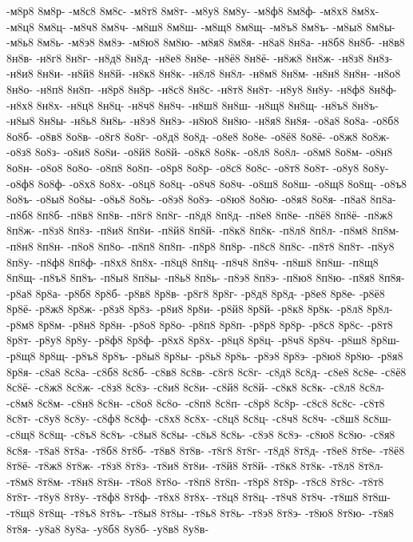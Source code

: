 {-м8р8
8м8р-
-м8с8
8м8с-
-м8т8
8м8т-
-м8у8
8м8у-
-м8ф8
8м8ф-
-м8х8
8м8х-
-м8ц8
8м8ц-
-м8ч8
8м8ч-
-м8ш8
8м8ш-
-м8щ8
8м8щ-
-м8ъ8
8м8ъ-
-м8ы8
8м8ы-
-м8ь8
8м8ь-
-м8э8
8м8э-
-м8ю8
8м8ю-
-м8я8
8м8я-
-н8а8
8н8а-
-н8б8
8н8б-
-н8в8
8н8в-
-н8г8
8н8г-
-н8д8
8н8д-
-н8е8
8н8е-
-н8ё8
8н8ё-
-н8ж8
8н8ж-
-н8з8
8н8з-
-н8и8
8н8и-
-н8й8
8н8й-
-н8к8
8н8к-
-н8л8
8н8л-
-н8м8
8н8м-
-н8н8
8н8н-
-н8о8
8н8о-
-н8п8
8н8п-
-н8р8
8н8р-
-н8с8
8н8с-
-н8т8
8н8т-
-н8у8
8н8у-
-н8ф8
8н8ф-
-н8х8
8н8х-
-н8ц8
8н8ц-
-н8ч8
8н8ч-
-н8ш8
8н8ш-
-н8щ8
8н8щ-
-н8ъ8
8н8ъ-
-н8ы8
8н8ы-
-н8ь8
8н8ь-
-н8э8
8н8э-
-н8ю8
8н8ю-
-н8я8
8н8я-
-о8а8
8о8а-
-о8б8
8о8б-
-о8в8
8о8в-
-о8г8
8о8г-
-о8д8
8о8д-
-о8е8
8о8е-
-о8ё8
8о8ё-
-о8ж8
8о8ж-
-о8з8
8о8з-
-о8и8
8о8и-
-о8й8
8о8й-
-о8к8
8о8к-
-о8л8
8о8л-
-о8м8
8о8м-
-о8н8
8о8н-
-о8о8
8о8о-
-о8п8
8о8п-
-о8р8
8о8р-
-о8с8
8о8с-
-о8т8
8о8т-
-о8у8
8о8у-
-о8ф8
8о8ф-
-о8х8
8о8х-
-о8ц8
8о8ц-
-о8ч8
8о8ч-
-о8ш8
8о8ш-
-о8щ8
8о8щ-
-о8ъ8
8о8ъ-
-о8ы8
8о8ы-
-о8ь8
8о8ь-
-о8э8
8о8э-
-о8ю8
8о8ю-
-о8я8
8о8я-
-п8а8
8п8а-
-п8б8
8п8б-
-п8в8
8п8в-
-п8г8
8п8г-
-п8д8
8п8д-
-п8е8
8п8е-
-п8ё8
8п8ё-
-п8ж8
8п8ж-
-п8з8
8п8з-
-п8и8
8п8и-
-п8й8
8п8й-
-п8к8
8п8к-
-п8л8
8п8л-
-п8м8
8п8м-
-п8н8
8п8н-
-п8о8
8п8о-
-п8п8
8п8п-
-п8р8
8п8р-
-п8с8
8п8с-
-п8т8
8п8т-
-п8у8
8п8у-
-п8ф8
8п8ф-
-п8х8
8п8х-
-п8ц8
8п8ц-
-п8ч8
8п8ч-
-п8ш8
8п8ш-
-п8щ8
8п8щ-
-п8ъ8
8п8ъ-
-п8ы8
8п8ы-
-п8ь8
8п8ь-
-п8э8
8п8э-
-п8ю8
8п8ю-
-п8я8
8п8я-
-р8а8
8р8а-
-р8б8
8р8б-
-р8в8
8р8в-
-р8г8
8р8г-
-р8д8
8р8д-
-р8е8
8р8е-
-р8ё8
8р8ё-
-р8ж8
8р8ж-
-р8з8
8р8з-
-р8и8
8р8и-
-р8й8
8р8й-
-р8к8
8р8к-
-р8л8
8р8л-
-р8м8
8р8м-
-р8н8
8р8н-
-р8о8
8р8о-
-р8п8
8р8п-
-р8р8
8р8р-
-р8с8
8р8с-
-р8т8
8р8т-
-р8у8
8р8у-
-р8ф8
8р8ф-
-р8х8
8р8х-
-р8ц8
8р8ц-
-р8ч8
8р8ч-
-р8ш8
8р8ш-
-р8щ8
8р8щ-
-р8ъ8
8р8ъ-
-р8ы8
8р8ы-
-р8ь8
8р8ь-
-р8э8
8р8э-
-р8ю8
8р8ю-
-р8я8
8р8я-
-с8а8
8с8а-
-с8б8
8с8б-
-с8в8
8с8в-
-с8г8
8с8г-
-с8д8
8с8д-
-с8е8
8с8е-
-с8ё8
8с8ё-
-с8ж8
8с8ж-
-с8з8
8с8з-
-с8и8
8с8и-
-с8й8
8с8й-
-с8к8
8с8к-
-с8л8
8с8л-
-с8м8
8с8м-
-с8н8
8с8н-
-с8о8
8с8о-
-с8п8
8с8п-
-с8р8
8с8р-
-с8с8
8с8с-
-с8т8
8с8т-
-с8у8
8с8у-
-с8ф8
8с8ф-
-с8х8
8с8х-
-с8ц8
8с8ц-
-с8ч8
8с8ч-
-с8ш8
8с8ш-
-с8щ8
8с8щ-
-с8ъ8
8с8ъ-
-с8ы8
8с8ы-
-с8ь8
8с8ь-
-с8э8
8с8э-
-с8ю8
8с8ю-
-с8я8
8с8я-
-т8а8
8т8а-
-т8б8
8т8б-
-т8в8
8т8в-
-т8г8
8т8г-
-т8д8
8т8д-
-т8е8
8т8е-
-т8ё8
8т8ё-
-т8ж8
8т8ж-
-т8з8
8т8з-
-т8и8
8т8и-
-т8й8
8т8й-
-т8к8
8т8к-
-т8л8
8т8л-
-т8м8
8т8м-
-т8н8
8т8н-
-т8о8
8т8о-
-т8п8
8т8п-
-т8р8
8т8р-
-т8с8
8т8с-
-т8т8
8т8т-
-т8у8
8т8у-
-т8ф8
8т8ф-
-т8х8
8т8х-
-т8ц8
8т8ц-
-т8ч8
8т8ч-
-т8ш8
8т8ш-
-т8щ8
8т8щ-
-т8ъ8
8т8ъ-
-т8ы8
8т8ы-
-т8ь8
8т8ь-
-т8э8
8т8э-
-т8ю8
8т8ю-
-т8я8
8т8я-
-у8а8
8у8а-
-у8б8
8у8б-
-у8в8
8у8в-
}
